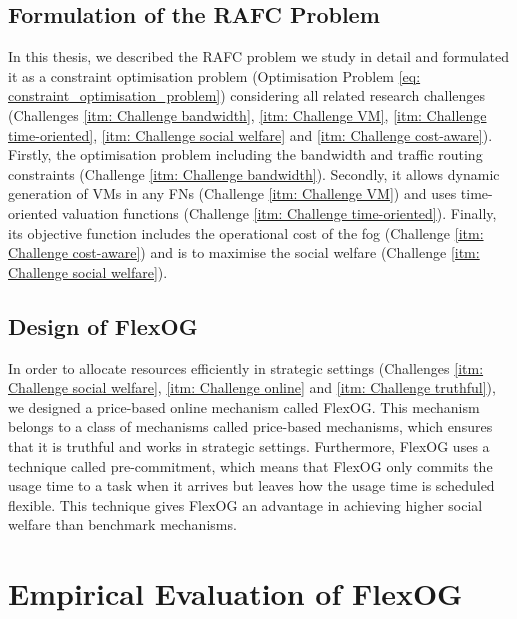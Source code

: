 \documentclass[11pt]{phdthesis}
\begin{document}
\subsection{Formulation of the RAFC Problem} \label{formulation of the RAFC problem}

In this thesis, we described the RAFC problem we study in detail and formulated it as a constraint optimisation problem (Optimisation Problem \ref{eq: constraint_optimisation_problem}) considering all related research challenges (Challenges \ref{itm: Challenge bandwidth}, \ref{itm: Challenge VM}, \ref{itm: Challenge time-oriented}, \ref{itm: Challenge social welfare} and \ref{itm: Challenge cost-aware}). Firstly, the optimisation problem including the bandwidth and traffic routing constraints (Challenge \ref{itm: Challenge bandwidth}). Secondly, it allows dynamic generation of VMs in any FNs (Challenge \ref{itm: Challenge VM}) and uses time-oriented valuation functions (Challenge \ref{itm: Challenge time-oriented}). Finally, its objective function includes the operational cost of the fog (Challenge \ref{itm: Challenge cost-aware}) and is to maximise the social welfare (Challenge \ref{itm: Challenge social welfare}). 

\subsection{Design of FlexOG} \label{design of FlexOG}

In order to allocate resources efficiently in strategic settings (Challenges \ref{itm: Challenge social welfare}, \ref{itm: Challenge online} and \ref{itm: Challenge truthful}), we designed a price-based online mechanism called FlexOG. This mechanism belongs to a class of mechanisms called price-based mechanisms, which ensures that it is truthful and works in strategic settings. Furthermore, FlexOG uses a technique called pre-commitment, which means that FlexOG only commits the usage time to a task when it arrives but leaves how the usage time is scheduled flexible. This technique gives FlexOG an advantage in achieving higher social welfare than benchmark mechanisms. 

\section{Empirical Evaluation of FlexOG} \label{empirical evaluation of FlexOG}
\end{document}
